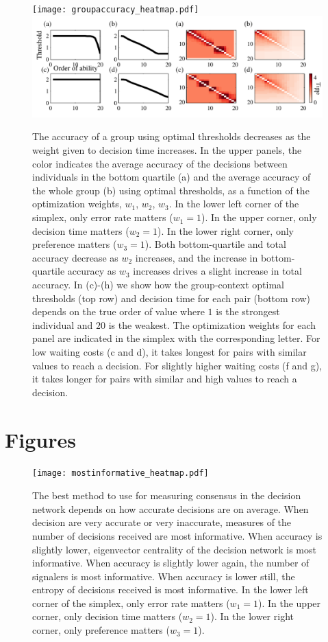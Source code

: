 \documentclass{article}
\begin{document}
\begin{figure}[ht]
\texttt{[image: groupaccuracy\_heatmap.pdf]}
\includegraphics[width=\textwidth]{groupeq_thresholds.pdf}
\caption{\label{groupeq}   The accuracy of a group using optimal thresholds decreases as the weight given to decision time increases.  In the upper panels, the color indicates the average accuracy of the decisions between individuals in the bottom quartile (a) and the average accuracy of the whole group (b) using optimal thresholds, as a function of the optimization weights, $w_1$, $w_2$, $w_3$.  In the lower left corner of the simplex, only error rate matters ($w_1=1$).  In the upper corner, only decision time matters ($w_2=1$).  In the lower right corner, only preference matters ($w_3=1$). Both bottom-quartile and total accuracy decrease as $w_2$ increases, and the increase in bottom-quartile accuracy as $w_3$ increases drives a slight increase in total accuracy.  In (c)-(h) we show how the group-context optimal thresholds (top row) and decision time for each pair (bottom row) depends on the true order of value where $1$ is the strongest individual and $20$ is the weakest. The optimization weights for each panel are indicated in the simplex with the corresponding letter.  For low waiting costs (c and d), it takes longest for pairs with similar values to reach a decision.  For slightly higher waiting costs (f and g), it takes longer for pairs with similar and high values to reach a decision.}

\end{figure}

\section{Figures}
\begin{figure}[ht]
\texttt{[image: mostinformative\_heatmap.pdf]}
\caption{\label{bestmetric} The best method to use for measuring consensus in the decision network depends on how accurate decisions are on average.  When decision are very accurate or very inaccurate, measures of the number of decisions received are most informative.  When accuracy is slightly lower, eigenvector centrality of the decision network is most informative.  When accuracy is slightly lower again, the number of signalers is most informative.  When accuracy is lower still, the entropy of decisions received is most informative.  In the lower left corner of the simplex, only error rate matters ($w_1=1$).  In the upper corner, only decision time matters ($w_2=1$).  In the lower right corner, only preference matters ($w_3=1$).}
\end{figure}
\end{document}
